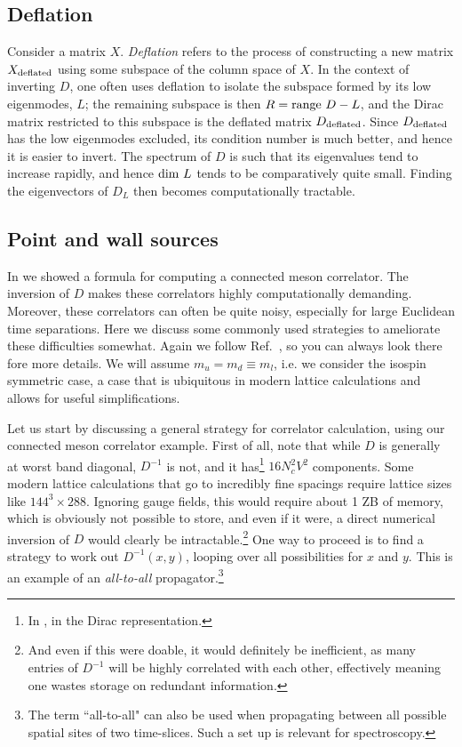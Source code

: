 \subsection{Deflation}\label{sec:deflation}

Consider a matrix $X$. {\it Deflation} refers to the process of constructing a
new matrix $X_{\rm deflated}$ using some subspace of the column space of $X$.
In the context of inverting $D$, one often uses deflation to
isolate the subspace formed by its low eigenmodes, $L$; the remaining subspace
is then $R={\rm range}~D-L$, and the Dirac matrix restricted to this
subspace is the deflated matrix $D_{\rm deflated}$. Since $D_{\rm deflated}$ has
the low eigenmodes excluded, its condition number is much better, and hence it
is easier to invert. The spectrum of $D$ is such that its eigenvalues tend to
increase rapidly, and hence ${\rm dim}~L$ tends to be comparatively quite small.
Finding the eigenvectors of $D_L$ then becomes computationally tractable.

\subsection{Point and wall sources}

In  we showed a formula for computing a connected
meson correlator. The inversion of $D$ makes these correlators highly
computationally demanding. Moreover, these correlators can often be quite noisy,
especially for large Euclidean time separations. Here we discuss some commonly
used strategies to ameliorate these difficulties somewhat. Again we follow
Ref.~\cite{gattringer_quantum_2010}, so you can always look there fore more
details. We will assume $m_u=m_d\equiv m_l$, i.e. we consider the isospin
symmetric case, a case that is ubiquitous in modern lattice calculations and
allows for useful simplifications.

Let us start by discussing a general strategy for correlator calculation,
using our connected meson correlator example. First of all, note that while $D$
is generally at worst band diagonal, $D^{-1}$ is not, and it has\footnote{In
, in the Dirac representation.} $16N_c^2V^2$ components. Some modern
lattice calculations that go to incredibly fine spacings require lattice sizes
like $144^3\times288$. Ignoring gauge fields, this would require about 1 ZB of
memory, which is obviously not possible to store, and even if it were, a direct
numerical inversion of $D$ would clearly be intractable.\footnote{And even if
this were doable, it would definitely be inefficient, as many entries of
$D^{-1}$ will be highly correlated with each other, effectively meaning one
wastes storage on redundant information.}
One way to proceed is to find a strategy to work out $D^{-1}(x,y)$, looping over
all possibilities for $x$ and $y$. This is an example of an {\it all-to-all}
propagator.\footnote{The term ``all-to-all" can also be used
when propagating between all possible spatial sites of two time-slices. Such a set
up is relevant for spectroscopy.}   

